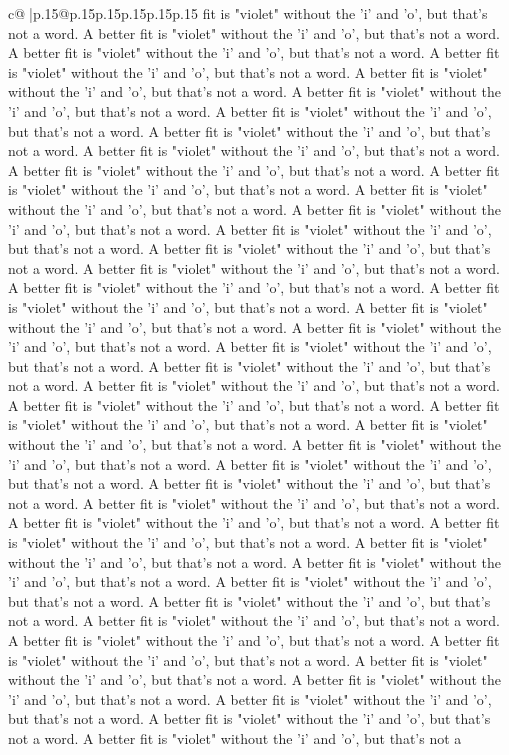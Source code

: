 \documentclass{article}
\begin{document}
{\begin{supertabular}{c@{$\;$}|p{.15\linewidth}@{}p{.15\linewidth}p{.15\linewidth}p{.15\linewidth}p{.15\linewidth}p{.15\linewidth}}
{{{fit is "violet" without the 'i' and 'o', but that's not a word. A better fit is "violet" without the 'i' and 'o', but that's not a word. A better fit is "violet" without the 'i' and 'o', but that's not a word. A better fit is "violet" without the 'i' and 'o', but that's not a word. A better fit is "violet" without the 'i' and 'o', but that's not a word. A better fit is "violet" without the 'i' and 'o', but that's not a word. A better fit is "violet" without the 'i' and 'o', but that's not a word. A better fit is "violet" without the 'i' and 'o', but that's not a word. A better fit is "violet" without the 'i' and 'o', but that's not a word. A better fit is "violet" without the 'i' and 'o', but that's not a word. A better fit is "violet" without the 'i' and 'o', but that's not a word. A better fit is "violet" without the 'i' and 'o', but that's not a word. A better fit is "violet" without the 'i' and 'o', but that's not a word. A better fit is "violet" without the 'i' and 'o', but that's not a word. A better fit is "violet" without the 'i' and 'o', but that's not a word. A better fit is "violet" without the 'i' and 'o', but that's not a word. A better fit is "violet" without the 'i' and 'o', but that's not a word. A better fit is "violet" without the 'i' and 'o', but that's not a word. A better fit is "violet" without the 'i' and 'o', but that's not a word. A better fit is "violet" without the 'i' and 'o', but that's not a word. A better fit is "violet" without the 'i' and 'o', but that's not a word. A better fit is "violet" without the 'i' and 'o', but that's not a word. A better fit is "violet" without the 'i' and 'o', but that's not a word. A better fit is "violet" without the 'i' and 'o', but that's not a word. A better fit is "violet" without the 'i' and 'o', but that's not a word. A better fit is "violet" without the 'i' and 'o', but that's not a word. A better fit is "violet" without the 'i' and 'o', but that's not a word. A better fit is "violet" without the 'i' and 'o', but that's not a word. A better fit is "violet" without the 'i' and 'o', but that's not a word. A better fit is "violet" without the 'i' and 'o', but that's not a word. A better fit is "violet" without the 'i' and 'o', but that's not a word. A better fit is "violet" without the 'i' and 'o', but that's not a word. A better fit is "violet" without the 'i' and 'o', but that's not a word. A better fit is "violet" without the 'i' and 'o', but that's not a word. A better fit is "violet" without the 'i' and 'o', but that's not a word. A better fit is "violet" without the 'i' and 'o', but that's not a word. A better fit is "violet" without the 'i' and 'o', but that's not a word. A better fit is "violet" without the 'i' and 'o', but that's not a word. A better fit is "violet" without the 'i' and 'o', but that's not a word. A better fit is "violet" without the 'i' and 'o', but that's not a word. A better fit is "violet" without the 'i' and 'o', but that's not a word. A better fit is "violet" without the 'i' and 'o', but that's not a word. A better fit is "violet" without the 'i' and 'o', but that's not a word. A better fit is "violet" without the 'i' and 'o', but that's not a }}}
\end{supertabular}}
\end{document}
